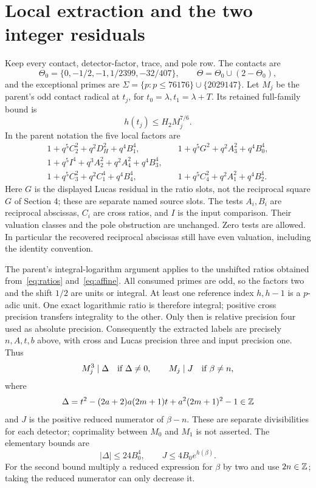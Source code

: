 \documentclass[11pt,a4paper]{article}
\begin{document}
\section{Local extraction and the two integer residuals}
Keep every contact, detector-factor, trace, and pole row. The contacts are
\[
 \Theta_0=\{0,-1/2,-1,1/2399,-32/407\},\qquad
 \Theta=\Theta_0\cup(2-\Theta_0),
\]
and the exceptional primes are $\Sigma=\{p:p\le76176\}\cup\{2029147\}$.
Let $M_j$ be the parent's odd contact radical at $t_j$, for
$t_0=\lambda,t_1=\lambda+T$. Its retained full-family bound is
\[
                         h(t_j)\le H_2M_j^{7/6}.
\]
In the parent notation the five local factors are
\begin{align*}
 1+q^5C_2^2+q^2D_H^2+q^4B_1^4,&\quad
 1+q^5G^2+q^2A_3^2+q^4B_0^4,\\
 1+q^5I^4+q^3A_2^2+q^2A_4^2+q^4B_3^4,&\\
 1+q^5C_3^2+q^2C_1^4+q^4B_4^4,&\quad
 1+q^5C_4^2+q^2A_1^2+q^4B_2^4.
\end{align*}
Here $G$ is the displayed Lucas residual in the ratio slots, not the
reciprocal square $G$ of Section 4; these are separate named source slots.
The tests $A_i,B_i$ are reciprocal abscissas, $C_i$ are cross ratios,
and $I$ is the input comparison. Their valuation classes and the pole
obstruction are unchanged. Zero tests are allowed. In particular the
recovered reciprocal abscissas still have even valuation, including the
identity convention.

The parent's integral-logarithm argument applies to the unshifted ratios
obtained from~\eqref{eq:ratios} and~\eqref{eq:affine}. All consumed primes
are odd, so the factors two and the shift $1/2$ are units or integral.
At least one reference index $h,h-1$ is a $p$-adic unit. One exact
logarithmic ratio is therefore integral; positive cross precision transfers
integrality to the other. Only then is relative precision four used as
absolute precision. Consequently the extracted labels are precisely
$n,A,t,b$ above, with cross and Lucas precision three and input precision
one. Thus
\begin{equation}\label{eq:divisibility}
 M_j^3\mid\Delta\quad\hbox{if }\Delta\ne0,\qquad
 M_j\mid J\quad\hbox{if }\beta\ne n,
\end{equation}
where
\begin{equation}\label{eq:delta}
 \Delta=t^2-(2a+2)a(2m+1)t+a^2(2m+1)^2-1\in\mathbb Z
\end{equation}
and $J$ is the positive reduced numerator of $\beta-n$.
These are separate divisibilities for each detector; coprimality between
$M_0$ and $M_1$ is not asserted. The elementary bounds are
\begin{equation}\label{eq:bounds}
 |
 \Delta|\le24B_0^4,\qquad J\le4B_0e^{h(\beta)}.
\end{equation}
For the second bound multiply a reduced expression for $\beta$ by two
and use $2n\in\mathbb Z$; taking the reduced numerator can only decrease it.
\end{document}
